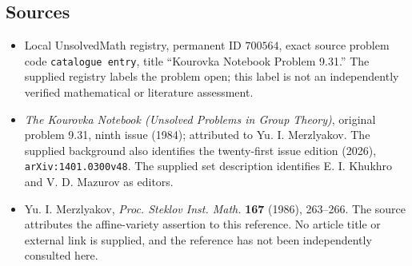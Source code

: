 \documentclass[11pt]{article}
\begin{document}
\subsection{Sources}
\begin{itemize}
\item Local UnsolvedMath registry, permanent ID \(700564\), exact source problem code \texttt{catalogue entry}, title ``Kourovka Notebook Problem 9.31.'' The supplied registry labels the problem open; this label is not an independently verified mathematical or literature assessment.
\item \emph{The Kourovka Notebook (Unsolved Problems in Group Theory)}, original problem 9.31, ninth issue (1984); attributed to Yu. I. Merzlyakov. The supplied background also identifies the twenty-first issue edition (2026), \texttt{arXiv:1401.0300v48}. The supplied set description identifies E. I. Khukhro and V. D. Mazurov as editors.
\item Yu. I. Merzlyakov, \emph{Proc. Steklov Inst. Math.} \textbf{167} (1986), 263--266. The source attributes the affine-variety assertion to this reference. No article title or external link is supplied, and the reference has not been independently consulted here.
\end{itemize}
\end{document}
